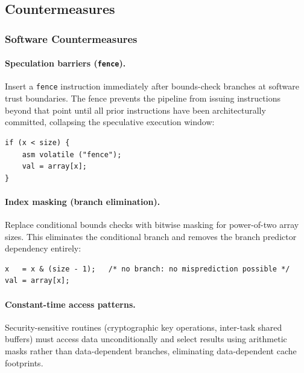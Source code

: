 \subsection{Countermeasures}
\label{subsec:countermeasures}

\subsubsection{Software Countermeasures}

\paragraph{Speculation barriers (\texttt{fence}).}
Insert a \texttt{fence} instruction immediately after bounds-check branches at
software trust boundaries.  The fence prevents the pipeline from issuing
instructions beyond that point until all prior instructions have been architecturally
committed, collapsing the speculative execution window:

\begin{lstlisting}[style=cstyle, caption={Speculation barrier example}, label={lst:speculation_barrier}]
if (x < size) {
    asm volatile ("fence");
    val = array[x];
}
\end{lstlisting}

\paragraph{Index masking (branch elimination).}
Replace conditional bounds checks with bitwise masking for power-of-two array
sizes. This eliminates the conditional branch and removes the branch predictor
dependency entirely:

\begin{lstlisting}[style=cstyle, caption={Index masking example}, label={lst:index_masking}]
x   = x & (size - 1);   /* no branch: no misprediction possible */
val = array[x];
\end{lstlisting}

\paragraph{Constant-time access patterns.}
Security-sensitive routines (cryptographic key operations, inter-task shared
buffers) must access data unconditionally and select results using arithmetic
masks rather than data-dependent branches, eliminating data-dependent cache
footprints.


